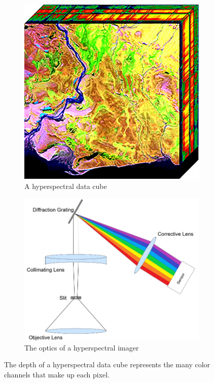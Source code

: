\documentclass[psamsfonts]{amsart}
\theoremstyle{definition}
\theoremstyle{remark}
\numberwithin{equation}{section}
\begin{document}
\begin{figure}[ht]
  \centering
  \begin{subfigure}[b]{0.37\textwidth}
    \centering
    \includegraphics[width=\textwidth]{datacube.png}
    \caption{A hyperspectral data cube \cite{hsi-cube}}
    \label{fig:image1}
  \end{subfigure}
  \hfill
  \begin{subfigure}[b]{0.53\textwidth}
    \centering
    \includegraphics[width=\textwidth]{hsi_optics.png}
    \caption{The optics of a hyperspectral imager \cite{nat-presentation}}
    \label{fig:image2}
  \end{subfigure}
  \caption{The depth of a hyperspectral data cube represents the many color channels that make up each pixel.}
  \label{fig:hsi}
\end{figure}
\end{document}
